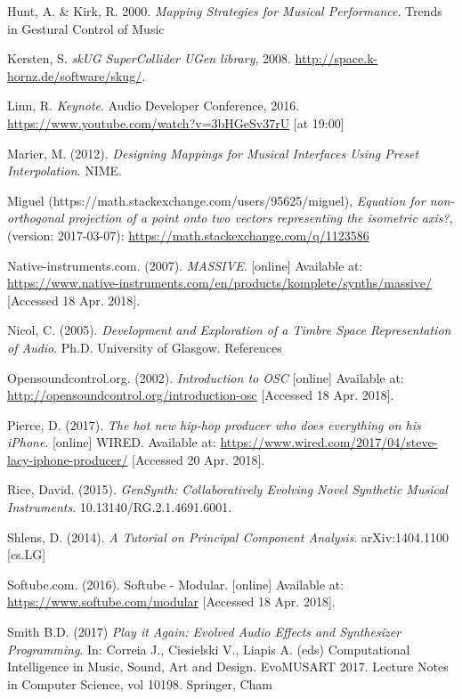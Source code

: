 \documentclass[11pt, oneside]{report}   	%
\begin{document}
\begin{thebibliography}{9}
Hunt, A. \& Kirk, R. 2000. \emph{Mapping Strategies for Musical Performance}. Trends in Gestural Control of Music

Kersten, S. \emph{skUG SuperCollider UGen library}, 2008. \url{http://space.k- hornz.de/software/skug/}.

Linn, R. \emph{Keynote}.  Audio Developer Conference, 2016. \url{https://www.youtube.com/watch?v=3bHGeSv37rU} [at 19:00]

Marier, M. (2012). \emph{Designing Mappings for Musical Interfaces Using Preset Interpolation}. NIME.

Miguel (https://math.stackexchange.com/users/95625/miguel), \emph{Equation for non-orthogonal projection of a point onto two vectors representing the isometric axis?}, (version: 2017-03-07): \url{https://math.stackexchange.com/q/1123586}

Native-instruments.com. (2007). \emph{MASSIVE}. [online] Available at: \url{https://www.native-instruments.com/en/products/komplete/synths/massive/} [Accessed 18 Apr. 2018].

Nicol, C. (2005). \emph{Development and Exploration of a Timbre Space Representation of Audio}. Ph.D. University of Glasgow.
References

Opensoundcontrol.org. (2002). \emph{Introduction to OSC} [online] Available at: \url{http://opensoundcontrol.org/introduction-osc} [Accessed 18 Apr. 2018].

Pierce, D. (2017). \emph{The hot new hip-hop producer who does everything on his iPhone}. [online] WIRED. Available at: \url{https://www.wired.com/2017/04/steve-lacy-iphone-producer/} [Accessed 20 Apr. 2018].

Rice, David. (2015). \emph{GenSynth: Collaboratively Evolving Novel Synthetic Musical Instruments}. 10.13140/RG.2.1.4691.6001. 

Shlens, D. (2014). \emph{A Tutorial on Principal Component Analysis}. arXiv:1404.1100 [cs.LG]

Softube.com. (2016). Softube - Modular. [online] Available at: \url{https://www.softube.com/modular} [Accessed 18 Apr. 2018].

Smith B.D. (2017) \emph{Play it Again: Evolved Audio Effects and Synthesizer Programming}. In: Correia J., Ciesielski V., Liapis A. (eds) Computational Intelligence in Music, Sound, Art and Design. EvoMUSART 2017. Lecture Notes in Computer Science, vol 10198. Springer, Cham


\end{thebibliography}
\end{document}
